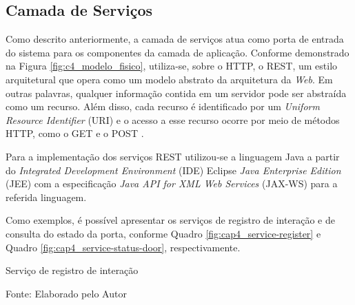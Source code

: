 
\subsection{Camada de Serviços} \label{ssec:c5_camada_servicos}

Como descrito anteriormente, a camada de serviços atua como porta de entrada do sistema para os componentes da camada de aplicação. 
Conforme demonstrado na Figura \ref{fig:c4_modelo_fisico}, utiliza-se, sobre o HTTP, o REST, um estilo arquitetural que opera como um modelo abstrato da arquitetura da \textit{Web}. Em outras palavras, qualquer informação contida em um servidor pode ser abstraída como um recurso. Além disso, cada recurso é identificado por um \textit{Uniform Resource Identifier } (URI) e o acesso a esse recurso ocorre por meio de métodos HTTP, como o GET e o POST \cite{Fielding2000}.

Para a implementação dos serviços REST utilizou-se a linguagem Java a partir do \textit{ Integrated Development Environment} (IDE) Eclipse \textit{Java Enterprise Edition} (JEE) com a especificação \textit{Java API for XML Web Services} (JAX-WS) para a referida linguagem.

Como exemplos, é possível apresentar os serviços de registro de interação e de consulta do estado da porta, conforme Quadro \ref{fig:cap4_service-register} e Quadro \ref{fig:cap4_service-status-door}, respectivamente.

\begin{quadro}[htb]
    \caption{Serviço de registro de interação}
    \label{fig:cap4_service-register}
    
    \footnotesize{Fonte: Elaborado pelo Autor}
\end{quadro}


%        


